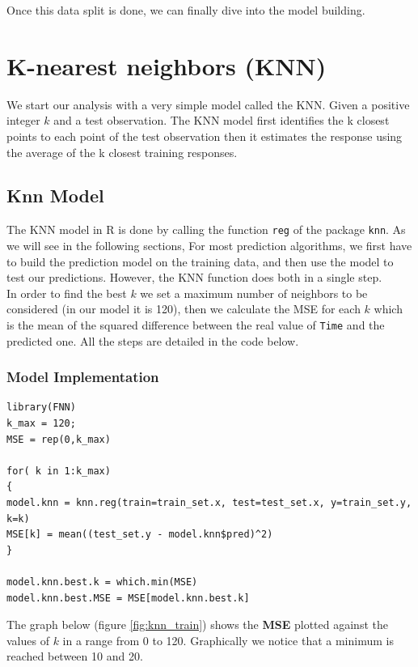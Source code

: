 \documentclass[]{report}
\begin{document}
Once this data split is done, we can finally dive into the model building.

\section{K-nearest neighbors (KNN)}
We start our analysis with a very simple model called the KNN.
Given a positive integer $k$ and a test observation. The KNN model first identifies the k closest points to each point of the test observation then it estimates the response using the average of the k closest training responses.\\ 

\subsection{Knn Model}
The KNN model in R is done by calling the function \texttt{reg} of the package \texttt{knn}. As we will see in the following sections, For most prediction algorithms, we first have to build the prediction model on the training data, and then use the model to test our predictions. However, the KNN function does both in a single step.\\ 
In order to find the best $k$ we set a maximum number of neighbors to be considered (in our model it is 120), then we calculate the MSE for each $k$ which is the mean of the squared difference between the real value of \texttt{Time} and the predicted one. All the steps are detailed in the code below.

\subsubsection{Model Implementation}
\begin{lstlisting}
library(FNN)
k_max = 120;
MSE = rep(0,k_max)

for( k in 1:k_max)
{
model.knn = knn.reg(train=train_set.x, test=test_set.x, y=train_set.y, k=k)
MSE[k] = mean((test_set.y - model.knn$pred)^2)
}

model.knn.best.k = which.min(MSE)
model.knn.best.MSE = MSE[model.knn.best.k] 
\end{lstlisting}

The graph below (figure \ref{fig:knn_train}) shows the \textbf{ MSE} plotted against the values of $k$ in a range from 0 to 120. Graphically we notice that a minimum is reached between 10 and 20.
\end{document}
